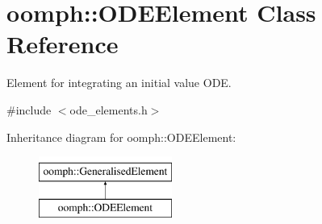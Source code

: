 \hypertarget{classoomph_1_1ODEElement}{}\section{oomph\+:\+:O\+D\+E\+Element Class Reference}
\label{classoomph_1_1ODEElement}


Element for integrating an initial value O\+DE.  




{\ttfamily \#include $<$ode\+\_\+elements.\+h$>$}

Inheritance diagram for oomph\+:\+:O\+D\+E\+Element\+:\begin{figure}[H]
\begin{center}
\leavevmode
\includegraphics[height=2.000000cm]{classoomph_1_1ODEElement}
\end{center}
\end{figure}
